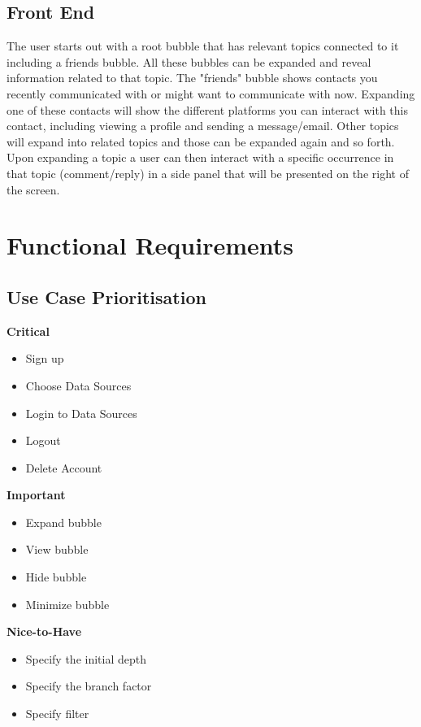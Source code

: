 \documentclass[hidelinks,english]{article}
\begin{document}
		\subsection{Front End}
		The user starts out with a root bubble that has relevant topics connected to it including a friends bubble. All these bubbles can be expanded and reveal information related to that topic. The "friends" bubble shows contacts you recently communicated with or might want to communicate with now. Expanding one of these contacts will show the different platforms you can interact with this contact, including viewing a profile and sending a message/email. Other topics will expand into related topics and those can be expanded again and so forth. Upon expanding a topic a user can then interact with a specific occurrence in that topic (comment/reply) in a side panel that will be presented on the right of the screen.
	
	\section{Functional Requirements}		
		\subsection{Use Case Prioritisation}
			\textbf{Critical}
			\begin{itemize}
			    \item Sign up
			    \item Choose Data Sources
			    \item Login to Data Sources
			    \item Logout
			    \item Delete Account
			\end{itemize}
			\textbf{Important}
			\begin{itemize}
			    \item Expand bubble
			    \item View bubble
			    \item Hide bubble
			    \item Minimize bubble
			\end{itemize}
			\textbf{Nice-to-Have}
			\begin{itemize}
			\item Specify the initial depth
			    \item Specify the branch factor
			    \item Specify filter
			    
			\end{itemize}
\end{document}
